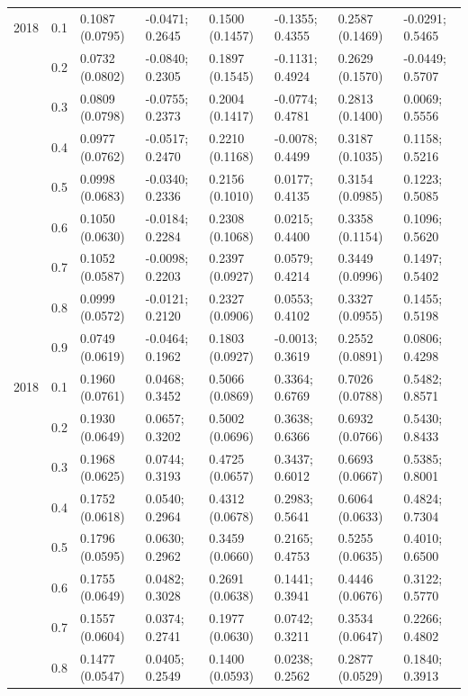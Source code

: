 \begin{table}
{\begin{tabular}[t]{llllllll}
2018 & 0.1 & 0.1087 (0.0795) & -0.0471; 0.2645 & 0.1500 (0.1457) & -0.1355; 0.4355 & 0.2587 (0.1469) & -0.0291; 0.5465\\
 & 0.2 & 0.0732 (0.0802) & -0.0840; 0.2305 & 0.1897 (0.1545) & -0.1131; 0.4924 & 0.2629 (0.1570) & -0.0449; 0.5707\\
 & 0.3 & 0.0809 (0.0798) & -0.0755; 0.2373 & 0.2004 (0.1417) & -0.0774; 0.4781 & 0.2813 (0.1400) & 0.0069; 0.5556\\
 & 0.4 & 0.0977 (0.0762) & -0.0517; 0.2470 & 0.2210 (0.1168) & -0.0078; 0.4499 & 0.3187 (0.1035) & 0.1158; 0.5216\\
 & 0.5 & 0.0998 (0.0683) & -0.0340; 0.2336 & 0.2156 (0.1010) & 0.0177; 0.4135 & 0.3154 (0.0985) & 0.1223; 0.5085\\
 & 0.6 & 0.1050 (0.0630) & -0.0184; 0.2284 & 0.2308 (0.1068) & 0.0215; 0.4400 & 0.3358 (0.1154) & 0.1096; 0.5620\\
 & 0.7 & 0.1052 (0.0587) & -0.0098; 0.2203 & 0.2397 (0.0927) & 0.0579; 0.4214 & 0.3449 (0.0996) & 0.1497; 0.5402\\
 & 0.8 & 0.0999 (0.0572) & -0.0121; 0.2120 & 0.2327 (0.0906) & 0.0553; 0.4102 & 0.3327 (0.0955) & 0.1455; 0.5198\\
 & 0.9 & 0.0749 (0.0619) & -0.0464; 0.1962 & 0.1803 (0.0927) & -0.0013; 0.3619 & 0.2552 (0.0891) & 0.0806; 0.4298\\
2018 & 0.1 & 0.1960 (0.0761) & 0.0468; 0.3452 & 0.5066 (0.0869) & 0.3364; 0.6769 & 0.7026 (0.0788) & 0.5482; 0.8571\\
 & 0.2 & 0.1930 (0.0649) & 0.0657; 0.3202 & 0.5002 (0.0696) & 0.3638; 0.6366 & 0.6932 (0.0766) & 0.5430; 0.8433\\
 & 0.3 & 0.1968 (0.0625) & 0.0744; 0.3193 & 0.4725 (0.0657) & 0.3437; 0.6012 & 0.6693 (0.0667) & 0.5385; 0.8001\\
 & 0.4 & 0.1752 (0.0618) & 0.0540; 0.2964 & 0.4312 (0.0678) & 0.2983; 0.5641 & 0.6064 (0.0633) & 0.4824; 0.7304\\
 & 0.5 & 0.1796 (0.0595) & 0.0630; 0.2962 & 0.3459 (0.0660) & 0.2165; 0.4753 & 0.5255 (0.0635) & 0.4010; 0.6500\\
 & 0.6 & 0.1755 (0.0649) & 0.0482; 0.3028 & 0.2691 (0.0638) & 0.1441; 0.3941 & 0.4446 (0.0676) & 0.3122; 0.5770\\
 & 0.7 & 0.1557 (0.0604) & 0.0374; 0.2741 & 0.1977 (0.0630) & 0.0742; 0.3211 & 0.3534 (0.0647) & 0.2266; 0.4802\\
 & 0.8 & 0.1477 (0.0547) & 0.0405; 0.2549 & 0.1400 (0.0593) & 0.0238; 0.2562 & 0.2877 (0.0529) & 0.1840; 0.3913\\

\end{tabular}}
\end{table}
